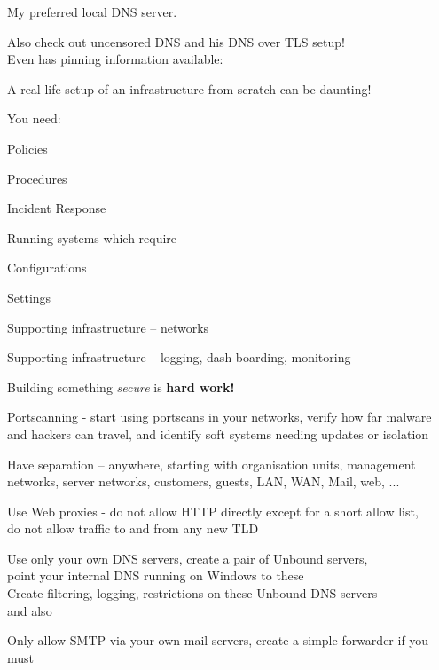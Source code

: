 \documentclass[Screen16to9,17pt]{foils}
\begin{document}

My preferred local DNS server.

Also check out uncensored DNS and his DNS over TLS setup!\\
Even has pinning information available:\\ {\small{}}




\begin{list1}
\item A real-life setup of an infrastructure from scratch can be daunting!
\item You need:
\begin{list2}
\item Policies
\item Procedures
\item Incident Response
\end{list2}
\item Running systems which require
\begin{list2}
\item Configurations
\item Settings
\item Supporting infrastructure -- networks
\item Supporting infrastructure -- logging, dash boarding, monitoring
\end{list2}
\item Building something \emph{secure} is {\bf hard work!}
\end{list1}






\begin{list2}
\item Portscanning - start using portscans in your networks, verify how far malware and hackers can travel, and identify soft systems needing updates or isolation
\item Have separation -- anywhere, starting with organisation units, management networks, server networks, customers, guests, LAN, WAN, Mail, web, ...
\item Use Web proxies - do not allow HTTP directly except for a short allow list, \\
do not allow traffic to and from any new TLD
\item Use only your own DNS servers, create a pair of Unbound servers, \\
point your internal DNS running on Windows to these\\
Create filtering, logging, restrictions on these Unbound DNS servers\\
 and also 
\item Only allow SMTP via your own mail servers, create a simple forwarder if you must
\end{list2}
\end{document}
